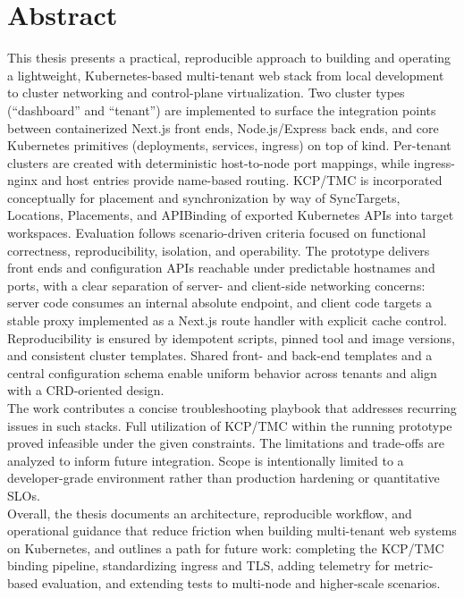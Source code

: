 \documentclass[11pt, a4paper, oneside, listof=totoc]{scrartcl}
\begin{document}
    \section*{Abstract}\label{abstract}
        This thesis presents a practical, reproducible approach to building and operating a
        lightweight, Kubernetes-based multi-tenant web stack from local development to cluster
        networking and control-plane virtualization.
        Two cluster types (\enquote{dashboard} and \enquote{tenant}) are implemented to surface the
        integration points between containerized Next.js front ends, Node.js/Express back ends, and
        core Kubernetes primitives (deployments, services, ingress) on top of kind.
        Per-tenant clusters are created with deterministic host-to-node port mappings, while
        ingress-nginx and host entries provide name-based routing.
        KCP/TMC is incorporated conceptually for placement and synchronization by way of
        SyncTargets, Locations, Placements, and APIBinding of exported Kubernetes APIs into target
        workspaces.
        Evaluation follows scenario-driven criteria focused on functional correctness,
        reproducibility, isolation, and operability.
        The prototype delivers front ends and configuration APIs reachable under predictable
        hostnames and ports, with a clear separation of server- and client-side networking concerns:
        server code consumes an internal absolute endpoint, and client code targets a stable proxy
        implemented as a Next.js route handler with explicit cache control.
        Reproducibility is ensured by idempotent scripts, pinned tool and image versions, and
        consistent cluster templates.
        Shared front- and back-end templates and a central configuration schema enable uniform
        behavior across tenants and align with a CRD-oriented design.\\
        The work contributes a concise troubleshooting playbook that addresses recurring issues in
        such stacks.
        Full utilization of KCP/TMC within the running prototype proved infeasible under the given
        constraints.
        The limitations and trade-offs are analyzed to inform future integration.
        Scope is intentionally limited to a developer-grade environment rather than production
        hardening or quantitative SLOs.\\
        Overall, the thesis documents an architecture, reproducible workflow, and operational
        guidance that reduce friction when building multi-tenant web systems on Kubernetes, and
        outlines a path for future work: completing the KCP/TMC binding pipeline, standardizing
        ingress and TLS, adding telemetry for metric-based evaluation, and extending tests to
        multi-node and higher-scale scenarios.
\end{document}
